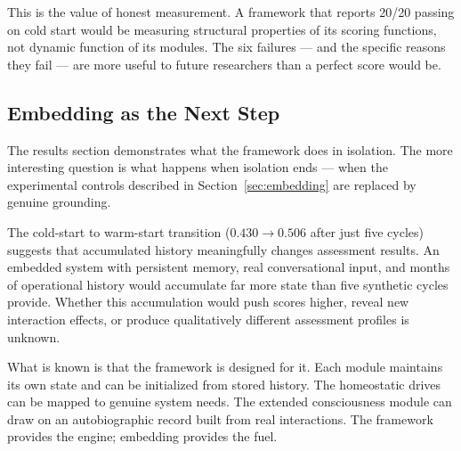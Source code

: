 This is the value of honest measurement. A framework that reports 20/20 passing on cold start would be measuring structural properties of its scoring functions, not dynamic function of its modules. The six failures --- and the specific reasons they fail --- are more useful to future researchers than a perfect score would be.

\subsection{Embedding as the Next Step}

The results section demonstrates what the framework does in isolation. The more interesting question is what happens when isolation ends --- when the experimental controls described in Section~\ref{sec:embedding} are replaced by genuine grounding.

The cold-start to warm-start transition ($0.430 \rightarrow 0.506$ after just five cycles) suggests that accumulated history meaningfully changes assessment results. An embedded system with persistent memory, real conversational input, and months of operational history would accumulate far more state than five synthetic cycles provide. Whether this accumulation would push scores higher, reveal new interaction effects, or produce qualitatively different assessment profiles is unknown.

What is known is that the framework is designed for it. Each module maintains its own state and can be initialized from stored history. The homeostatic drives can be mapped to genuine system needs. The extended consciousness module can draw on an autobiographic record built from real interactions. The framework provides the engine; embedding provides the fuel.
